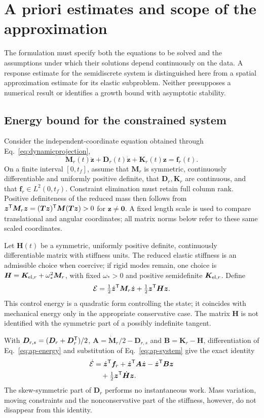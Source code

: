 \section{A priori estimates and scope of the approximation}
\label{sec:apriori}
The formulation must specify both the equations to be solved and the assumptions under which their solutions depend continuously on the data. A response estimate for the semidiscrete system is distinguished here from a spatial approximation estimate for its elastic subproblem. Neither presupposes a numerical result or identifies a growth bound with asymptotic stability.

\subsection{Energy bound for the constrained system}
Consider the independent-coordinate equation obtained through Eq.~\eqref{eq:dynamicprojection},
\begin{equation}
\bm M_r(t)\ddot{\bm z}+\bm D_r(t)\dot{\bm z}+\bm K_r(t)\bm z=\bm f_r(t).
\label{eq:ap-system}
\end{equation}
On a finite interval $[0,t_f]$, assume that $\bm M_r$ is symmetric, continuously differentiable and uniformly positive definite, that $\bm D_r,\bm K_r$ are continuous, and that $\bm f_r\in L^2(0,t_f)$. Constraint elimination must retain full column rank. Positive definiteness of the reduced mass then follows from $\bm z^\mathsf T\bm M_r\bm z=(\bm T\bm z)^\mathsf T\bm M(\bm T\bm z)>0$ for $\bm z\ne\bm0$. A fixed length scale is used to compare translational and angular coordinates; all matrix norms below refer to these same scaled coordinates.

Let $\bm H(t)$ be a symmetric, uniformly positive definite, continuously differentiable matrix with stiffness units. The reduced elastic stiffness is an admissible choice when coercive; if rigid modes remain, one choice is $\bm H=\bm K_{{\rm el},r}+\omega_*^2\bm M_r$, with fixed $\omega_*>0$ and positive semidefinite $\bm K_{{\rm el},r}$. Define
\begin{equation}
\mathcal E=\tfrac12\dot{\bm z}^\mathsf T\bm M_r\dot{\bm z}
+\tfrac12\bm z^\mathsf T\bm H\bm z.
\label{eq:ap-energy}
\end{equation}
This control energy is a quadratic form controlling the state; it coincides with mechanical energy only in the appropriate conservative case. The matrix $\bm H$ is not identified with the symmetric part of a possibly indefinite tangent.

With $\bm D_{r,s}=(\bm D_r+\bm D_r^\mathsf T)/2$, $\bm A=\dot{\bm M}_r/2-\bm D_{r,s}$ and $\bm B=\bm K_r-\bm H$, differentiation of Eq.~\eqref{eq:ap-energy} and substitution of Eq.~\eqref{eq:ap-system} give the exact identity
\begin{align}
\dot{\mathcal E}&=\dot{\bm z}^\mathsf T\bm f_r+\dot{\bm z}^\mathsf T\bm A\dot{\bm z}
-\dot{\bm z}^\mathsf T\bm B\bm z\nonumber\\
&\quad+\tfrac12\bm z^\mathsf T\dot{\bm H}\bm z.
\label{eq:ap-identity}
\end{align}
The skew-symmetric part of $\bm D_r$ performs no instantaneous work. Mass variation, moving constraints and the nonconservative part of the stiffness, however, do not disappear from this identity.

